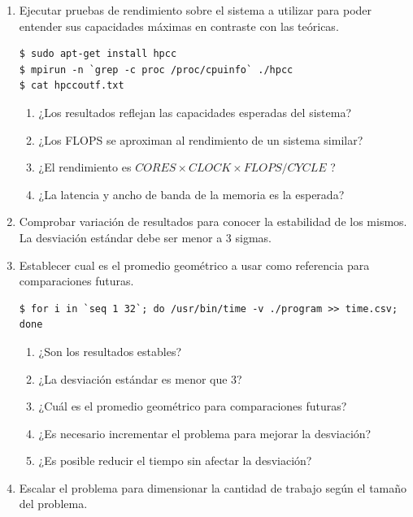 \documentclass[a4paper]{report}
\begin{document}
\begin{enumerate}
\item Ejecutar pruebas de rendimiento sobre el sistema a utilizar para poder entender sus capacidades máximas en contraste con las teóricas.

\begin{lstlisting}[caption={Instalación de HPCC},label={lst:hpcc}]
$ sudo apt-get install hpcc
$ mpirun -n `grep -c proc /proc/cpuinfo` ./hpcc
$ cat hpccoutf.txt
\end{lstlisting}

\begin{enumerate}
\item ¿Los resultados reflejan las capacidades esperadas del sistema?
\item ¿Los FLOPS se aproximan al rendimiento de un sistema similar?
\item ¿El rendimiento es $ CORES \times CLOCK \times FLOPS/CYCLE $ ?
\item ¿La latencia y ancho de banda de la memoria es la esperada?
\end{enumerate}

\item Comprobar variación de resultados para conocer la estabilidad de los mismos. La desviación estándar debe ser menor a 3 sigmas. 
\item Establecer cual es el promedio geométrico a usar como referencia para comparaciones futuras.

\begin{lstlisting}[caption={Estabilidad de Resultados},label={lst:time}]
$ for i in `seq 1 32`; do /usr/bin/time -v ./program >> time.csv; done
\end{lstlisting}

\begin{enumerate}
\item ¿Son los resultados estables?
\item ¿La desviación estándar es menor que 3?
\item ¿Cuál es el promedio geométrico para comparaciones futuras?
\item ¿Es necesario incrementar el problema para mejorar la desviación?
\item ¿Es posible reducir el tiempo sin afectar la desviación?
\end{enumerate}

\item Escalar el problema para dimensionar la cantidad de trabajo según el tamaño del problema.


\end{enumerate}
\end{document}
